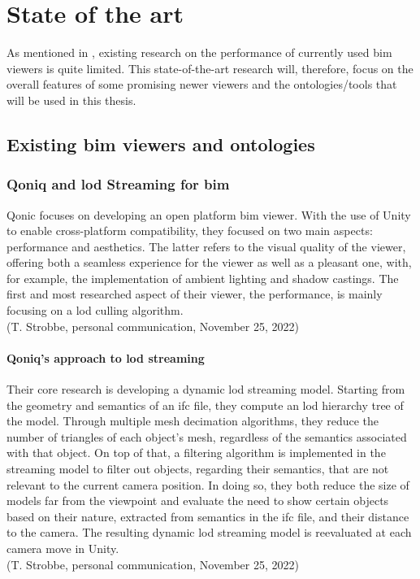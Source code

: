 \chapter{State of the art}
As mentioned in \cite{Johansson2015}, existing research on the performance of currently used \ac{bim} viewers is quite limited. This state-of-the-art research will, therefore, focus on the overall features of some promising newer viewers and the ontologies/tools that will be used in this thesis.

\section{Existing \acs{bim} viewers and ontologies}
\subsection{Qoniq and \acs{lod} Streaming for \acs{bim}}
Qonic focuses on developing an open platform \ac{bim} viewer. With the use of Unity to enable cross-platform compatibility, they focused on two main aspects: performance and aesthetics. The latter refers to the visual quality of the viewer, offering both a seamless experience for the viewer as well as a pleasant one, with, for example, the implementation of ambient lighting and shadow castings. The first and most researched aspect of their viewer, the performance, is mainly focusing on a \ac{lod} culling algorithm.
\\(T. Strobbe, personal communication, November 25, 2022)

\subsubsection{Qoniq's approach to \acs{lod} streaming}
Their core research is developing a dynamic \ac{lod} streaming model. Starting from the geometry and semantics of an \ac{ifc} file, they compute an \ac{lod} hierarchy tree of the model. Through multiple mesh decimation algorithms, they reduce the number of triangles of each object's mesh, regardless of the semantics associated with that object. On top of that, a filtering algorithm is implemented in the streaming model to filter out objects, regarding their semantics, that are not relevant to the current camera position. In doing so, they both reduce the size of models far from the viewpoint and evaluate the need to show certain objects based on their nature, extracted from semantics in the \ac{ifc} file, and their distance to the camera. The resulting dynamic \ac{lod} streaming model is reevaluated at each camera move in Unity.
\\(T. Strobbe, personal communication, November 25, 2022)

